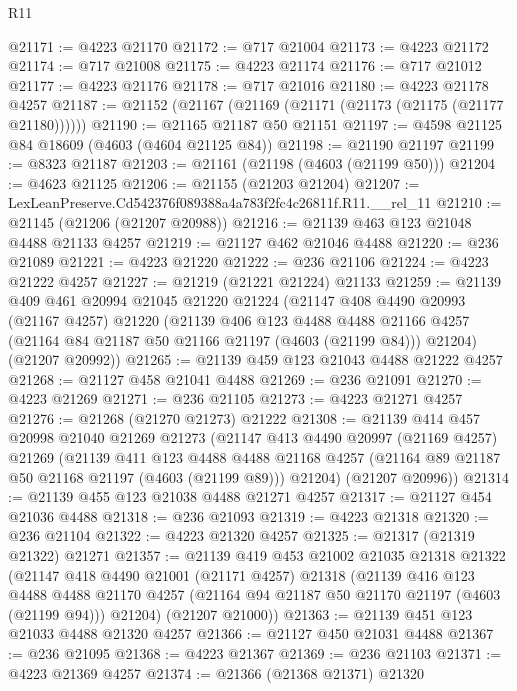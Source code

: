 \begin{lexlean}{R11}
\begin{coremodule}
@21171 := @4223 @21170
@21172 := @717 @21004
@21173 := @4223 @21172
@21174 := @717 @21008
@21175 := @4223 @21174
@21176 := @717 @21012
@21177 := @4223 @21176
@21178 := @717 @21016
@21180 := @4223 @21178 @4257
@21187 := @21152 (@21167 (@21169 (@21171 (@21173 (@21175 (@21177 @21180))))))
@21190 := @21165 @21187 @50 @21151
@21197 := @4598 @21125 @84 @18609 (@4603 (@4604 @21125 @84))
@21198 := @21190 @21197
@21199 := @8323 @21187
@21203 := @21161 (@21198 (@4603 (@21199 @50)))
@21204 := @4623 @21125
@21206 := @21155 (@21203 @21204)
@21207 := LexLeanPreserve.Cd542376f089388a4a783f2fc4c26811f.R11.__rel_11
@21210 := @21145 (@21206 (@21207 @20988))
@21216 := @21139 @463 @123 @21048 @4488 @21133 @4257
@21219 := @21127 @462 @21046 @4488
@21220 := @236 @21089
@21221 := @4223 @21220
@21222 := @236 @21106
@21224 := @4223 @21222 @4257
@21227 := @21219 (@21221 @21224) @21133
@21259 := @21139
    @409
    @461
    @20994
    @21045
    @21220
    @21224
    (@21147
      @408
      @4490
      @20993
      (@21167 @4257)
      @21220
      (@21139
        @406
        @123
        @4488
        @4488
        @21166
        @4257
        (@21164 @84 @21187 @50 @21166 @21197 (@4603 (@21199 @84)))
        @21204)
      (@21207 @20992))
@21265 := @21139 @459 @123 @21043 @4488 @21222 @4257
@21268 := @21127 @458 @21041 @4488
@21269 := @236 @21091
@21270 := @4223 @21269
@21271 := @236 @21105
@21273 := @4223 @21271 @4257
@21276 := @21268 (@21270 @21273) @21222
@21308 := @21139
    @414
    @457
    @20998
    @21040
    @21269
    @21273
    (@21147
      @413
      @4490
      @20997
      (@21169 @4257)
      @21269
      (@21139
        @411
        @123
        @4488
        @4488
        @21168
        @4257
        (@21164 @89 @21187 @50 @21168 @21197 (@4603 (@21199 @89)))
        @21204)
      (@21207 @20996))
@21314 := @21139 @455 @123 @21038 @4488 @21271 @4257
@21317 := @21127 @454 @21036 @4488
@21318 := @236 @21093
@21319 := @4223 @21318
@21320 := @236 @21104
@21322 := @4223 @21320 @4257
@21325 := @21317 (@21319 @21322) @21271
@21357 := @21139
    @419
    @453
    @21002
    @21035
    @21318
    @21322
    (@21147
      @418
      @4490
      @21001
      (@21171 @4257)
      @21318
      (@21139
        @416
        @123
        @4488
        @4488
        @21170
        @4257
        (@21164 @94 @21187 @50 @21170 @21197 (@4603 (@21199 @94)))
        @21204)
      (@21207 @21000))
@21363 := @21139 @451 @123 @21033 @4488 @21320 @4257
@21366 := @21127 @450 @21031 @4488
@21367 := @236 @21095
@21368 := @4223 @21367
@21369 := @236 @21103
@21371 := @4223 @21369 @4257
@21374 := @21366 (@21368 @21371) @21320

\end{coremodule}
\end{lexlean}
